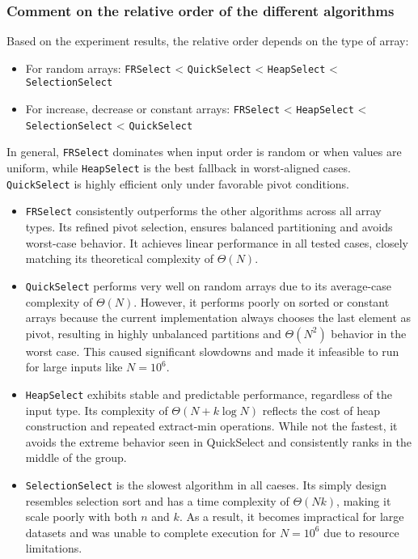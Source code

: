 \documentclass[acmconf,nonacm=true]{acmart}
\begin{document}
\subsubsection{Comment on the relative order of the different algorithms}


Based on the experiment results, the relative order depends on the type of array:
\begin{itemize}
    \item For random arrays: \texttt{FRSelect} < \texttt{QuickSelect} < \texttt{HeapSelect} < \texttt{SelectionSelect}
    \item For increase, decrease or constant arrays: \texttt{FRSelect} < \texttt{HeapSelect} < \texttt{SelectionSelect} < \texttt{QuickSelect}
\end{itemize}

In general, \texttt{FRSelect} dominates when input order is random or when values are uniform, while \texttt{HeapSelect} is the best fallback in worst-aligned cases. \texttt{QuickSelect} is highly efficient only under favorable pivot conditions.
\begin{itemize}
    \item \texttt{FRSelect} consistently outperforms the other algorithms across all array types. Its refined pivot selection, ensures balanced partitioning and avoids worst-case behavior. It achieves linear performance in all tested cases, closely matching its theoretical complexity of $\Theta(N)$.
    \item \texttt{QuickSelect} performs very well on random arrays due to its average-case complexity of $\Theta(N)$. However, it performs poorly on sorted or constant arrays because the current implementation always chooses the last element as pivot, resulting in highly unbalanced partitions and $\Theta(N^2)$ behavior in the worst case. This caused significant slowdowns and made it infeasible to run for large inputs like $N = 10^6$.
    \item \texttt{HeapSelect} exhibits stable and predictable performance, regardless of the input type. Its complexity of $\Theta(N + k \log N)$ reflects the cost of heap construction and repeated extract-min operations. While not the fastest, it avoids the extreme behavior seen in QuickSelect and consistently ranks in the middle of the group.
    \item \texttt{SelectionSelect} is the slowest algorithm in all caeses. Its simply design resembles selection sort and has a time complexity of $\Theta(Nk)$, making it scale poorly with both $n$ and $k$. As a result, it becomes impractical for large datasets and was unable to complete execution for $N = 10^6$ due to resource limitations.
\end{itemize}
\end{document}
